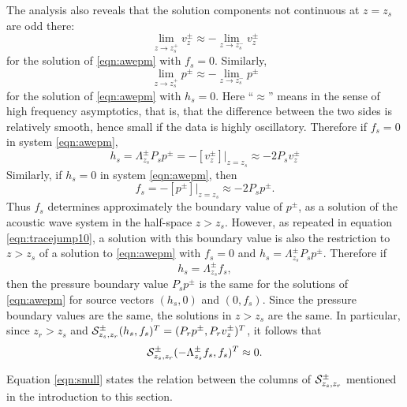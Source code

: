 The analysis also reveals that the solution components not continuous
at $z=z_s$ are odd there:
\begin{equation}
  \label{eqn:odd1}
  \lim_{z\rightarrow z_s^+} v^{\pm}_{z} \approx - \lim_{z\rightarrow z_s^-}
  v^{\pm}_{z}
\end{equation}
for the solution of \ref{eqn:awepm} with $f_s=0$.
Similarly, 
\begin{equation}
  \label{eqn:odd2}
  \lim_{z\rightarrow z_s^+} p^{\pm}\approx - \lim_{z\rightarrow z_s^-}
  p^{\pm}
\end{equation}
for the solution of \ref{eqn:awepm} with $h_s=0$. Here ``$\approx$''
means in the sense of high frequency asymptotics, that is, that the
difference between the two sides is relatively smooth, hence small if
the data is highly oscillatory. Therefore if $f_s=0$ in system \ref{eqn:awepm},
\begin{equation}
  h_s = \Lambda^{\pm}_{z_s}P_sp^{\pm} = -[v^{\pm}_{z}]|_{z=z_s} \approx -2
  P_sv^{\pm}_{z}
  \label{eqn:tracejump10}
\end{equation}
Similarly, if $h_s=0$ in system \ref{eqn:awepm}, then
\begin{equation}
  \label{eqn:tracejump20}
  f_s = -[p^{\pm}]|_{z=z_s} \approx -2 P_s p^{\pm}.
\end{equation}
Thus $f_s$ determines approximately the boundary value of $p^{\pm}$,
as a solution of the acoustic wave system in the half-space
$z>z_s$. However, as repeated in equation \ref{eqn:tracejump10}, a
solution with this boundary value is also the restriction to $z>z_s$
of a solution to \ref{eqn:awepm} with $f_s=0$ and $h_s=
\Lambda^{\pm}_{z_s}P_sp^{\pm}$. Therefore if
\begin{equation}
  \label{eqn:hfcondn}
  h_s =\Lambda^{\pm}_{z_s}f_s,
\end{equation}
then the pressure boundary value $P_sp^{\pm}$ is the
same for the solutions of \ref{eqn:awepm} for source vectors $(h_s,0)$
and $(0,f_s)$. Since the pressure boundary values are the same, the solutions
in $z>z_s$ are the same. In particular, since $z_r>z_s$ and ${\cal
  S}^{\pm}_{z_s,z_r}(h_s,f_s)^T = (P_rp^{\pm},P_rv^{\pm}_z)^T$, it follows
that
\begin{equation}
  \label{eqn:snull}
  {\cal S}^{\pm}_{z_s,z_r}(-\Lambda^{\pm}_{z_s}f_s,f_s)^T \approx 0.
\end{equation}

Equation \ref{eqn:snull} states the relation between the columns of $
{\cal S}^{\pm}_{z_s,z_r}$ mentioned in the introduction to this
section.

